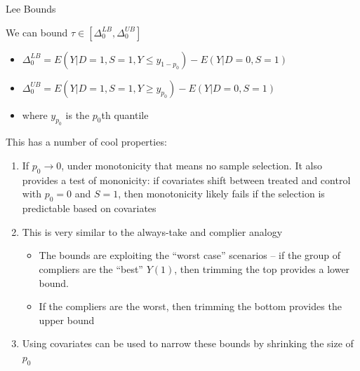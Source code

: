 \documentclass[notes,11pt, aspectratio=169]{beamer}
\newenvironment{wideitemize}{\itemize\addtolength{\itemsep}{10pt}}{\enditemize}
\begin{document}
\begin{frame}{Lee Bounds}
  \begin{wideitemize}
  \item We can bound $\tau \in [\Delta_{0}^{LB}, \Delta_{0}^{UB}]$
    \begin{itemize}
    \item $\Delta_{0}^{LB} = E(Y | D = 1, S = 1, Y \leq y_{1-p_{0}}) - E(Y | D = 0, S = 1)$
    \item $\Delta_{0}^{UB} = E(Y | D = 1, S = 1, Y \geq y_{p_{0}}) - E(Y | D = 0, S = 1)$
    \item where $y_{p_{0}}$ is the $p_{0}$th quantile
    \end{itemize}
  \item This has a number of cool properties:
    \begin{enumerate}
    \item If $p_{0} \to 0$, under monotonicity that means no sample
      selection. It also provides a test of mononicity: if covariates
      shift between treated and control with $p_{0} = 0$ and $S = 1$,
      then monotonicity likely fails if the selection is predictable based on covariates
    \item This is very similar to the always-take and complier analogy
      \begin{itemize}
      \item The bounds are exploiting the ``worst case'' scenarios --
        if the group of compliers are the ``best'' $Y(1)$, then
        trimming the top provides a lower bound.
      \item If the compliers are the worst, then trimming the bottom
        provides the upper bound
      \end{itemize}
    \item Using covariates can be used to narrow these bounds by shrinking the size of $p_{0}$
    \end{enumerate}
  \end{wideitemize}
\end{frame}
\end{document}
